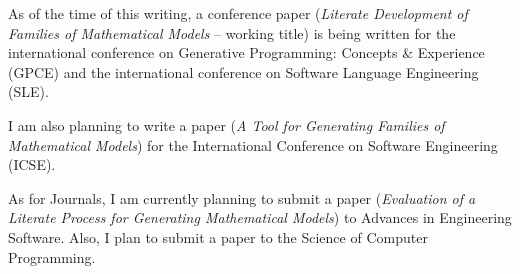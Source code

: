 \documentclass[11pt]{article} %
\begin{document}
As of the time of this writing, a conference paper 
(\textit{Literate Development of Families of Mathematical Models} -- working title) 
is being written for 
the international conference on Generative Programming: Concepts \& Experience
(GPCE) and the international conference on Software Language Engineering (SLE).

I am also planning to write a paper 
(\textit{A Tool for Generating Families of Mathematical Models})
for the International Conference on Software
Engineering (ICSE).

As for Journals, I am currently planning to submit a paper 
(\textit{Evaluation of a Literate Process for Generating Mathematical Models})
to Advances in Engineering Software. Also, I plan to submit a paper 
to the Science of Computer Programming. 
\end{document}
